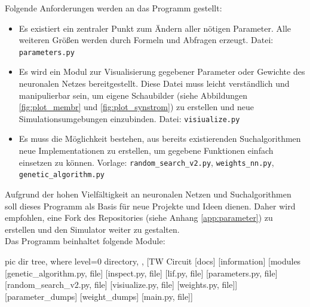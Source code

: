 	Folgende Anforderungen werden an das Programm gestellt:
	\begin{itemize}
		\item Es existiert ein zentraler Punkt zum Ändern aller nötigen Parameter. Alle weiteren Größen werden durch Formeln und Abfragen erzeugt.
		\subitem Datei: \texttt{parameters.py}
		\item Es wird ein Modul zur Visualisierung gegebener Parameter oder Gewichte des neuronalen Netzes bereitgestellt. Diese Datei muss leicht verständlich und manipulierbar sein, um eigene Schaubilder (siehe Abbildungen \ref{fig:plot_membr} und \ref{fig:plot_synstrom}) zu erstellen und neue Simulationsumgebungen einzubinden.
		\subitem Datei: \texttt{visiualize.py}
		\item Es muss die Möglichkeit bestehen, aus bereits existierenden Suchalgorithmen neue Implementationen zu erstellen, um gegebene Funktionen einfach einsetzen zu können.
		\subitem Vorlage: \texttt{random\_search\_v2.py}, \texttt{weights\_nn.py}, \texttt{genetic\_algorithm.py}
	\end{itemize}
	Aufgrund der hohen Vielfältigkeit an neuronalen Netzen und Suchalgorithmen soll dieses Programm als Basis für neue Projekte und Ideen dienen. Daher wird empfohlen, eine Fork des Repositories (siehe Anhang \ref{app:parameter}) zu erstellen und den Simulator weiter zu gestalten.\\
	Das Programm beinhaltet folgende Module:\\
	\begin{minipage}{0.35\textwidth}
		\vspace{0.3cm}
		\begin{forest}
			pic dir tree,
			where level=0{}{%
				directory,
			},
			[TW Circuit
				[docs]
				[information]
				[modules
					[genetic\_algorithm.py, file]
					[inspect.py, file]
					[lif.py, file]
					[parameters.py, file]
					[random\_search\_v2.py, file]
					[visiualize.py, file]
					[weights.py, file]]
				[parameter\_dumps]
				[weight\_dumps]
				[main.py, file]]
		\end{forest}
	\end{minipage}
